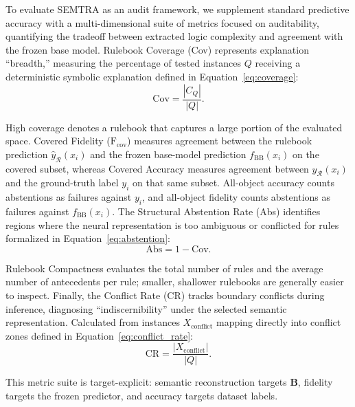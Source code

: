 \documentclass[make,article,submit,pdftex,moreauthors]{Definitions/mdpi}
\newcommand{\matB}{\mathbf{B}}
\newcommand{\Rule}{\mathcal{R}}
\begin{document}
To evaluate SEMTRA as an audit framework, we supplement standard predictive accuracy with a multi-dimensional suite of metrics focused on auditability, quantifying the tradeoff between extracted logic complexity and agreement with the frozen base model. Rulebook Coverage (Cov) represents explanation ``breadth,'' measuring the percentage of tested instances $Q$ receiving a deterministic symbolic explanation defined in Equation~\eqref{eq:coverage}:
\begin{equation}
 \label{eq:coverage}
 \mathrm{Cov} = \frac{|C_Q|}{|Q|}.
\end{equation}

High coverage denotes a rulebook that captures a large portion of the evaluated space. Covered Fidelity ($\mathrm{F}_{\text{cov}}$) measures agreement between the rulebook prediction $\hat{y}_{\Rule}(x_i)$ and the frozen base-model prediction $f_{\mathrm{BB}}(x_i)$ on the covered subset, whereas Covered Accuracy measures agreement between $\hat{y}_{\Rule}(x_i)$ and the ground-truth label $y_i$ on that same subset. All-object accuracy counts abstentions as failures against $y_i$, and all-object fidelity counts abstentions as failures against $f_{\mathrm{BB}}(x_i)$. The Structural Abstention Rate (Abs) identifies regions where the neural representation is too ambiguous or conflicted for rules formalized in Equation~\eqref{eq:abstention}:
\begin{equation}
 \label{eq:abstention}
 \mathrm{Abs} = 1 - \mathrm{Cov}.
\end{equation}

Rulebook Compactness evaluates the total number of rules and the average number of antecedents per rule; smaller, shallower rulebooks are generally easier to inspect. Finally, the Conflict Rate (CR) tracks boundary conflicts during inference, diagnosing ``indiscernibility'' under the selected semantic representation. Calculated from instances $X_{\mathrm{conflict}}$ mapping directly into conflict zones defined in Equation~\eqref{eq:conflict_rate}:
\begin{equation}
 \label{eq:conflict_rate}
 \mathrm{CR} = \frac{|X_{\mathrm{conflict}}|}{|Q|}.
\end{equation}

This metric suite is target-explicit: semantic reconstruction targets $\matB$, fidelity targets the frozen predictor, and accuracy targets dataset labels.

\end{document}
